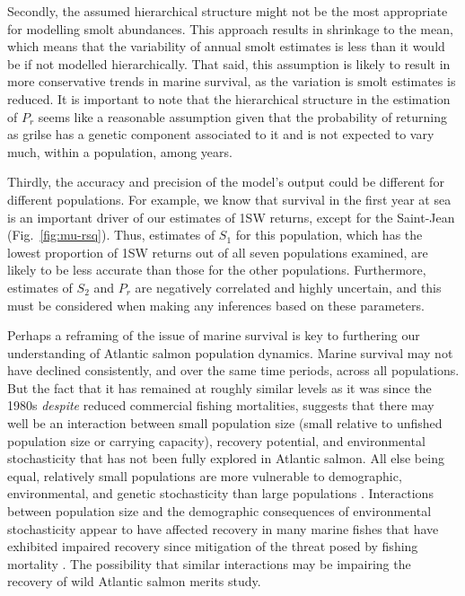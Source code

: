 \documentclass[12pt]{article}
\newcommand{\So}{$S_{1}$\xspace}
\newcommand{\St}{$S_{2}$\xspace}
\newcommand{\Pg}{$P_r$\xspace}
\begin{document}
Secondly, the assumed hierarchical structure might not be the most appropriate
for modelling smolt abundances. This approach results in shrinkage to the
mean, which means that the variability of annual smolt estimates is less than
it would be if not modelled hierarchically. 
That said, this assumption is likely to result in more conservative trends in marine survival, as the
variation is smolt estimates is reduced.
It is important to note that the hierarchical structure in the estimation of
\Pg seems like a reasonable assumption given that the probability of returning
as grilse has a genetic component associated to it \citep{Aykanat2019} and is
not expected to vary much, within a population, among years.

Thirdly, the accuracy and precision of the model's output could be different
for different populations. For example, we know that survival in the first
year at sea is an important driver of our estimates of 1SW returns, except for
the Saint-Jean (Fig.~\ref{fig:mu-rsq}). Thus, estimates of \So for this
population, which has the lowest proportion of 1SW returns out of all seven
populations examined, are likely to be less accurate than those for the other
populations.
Furthermore, estimates of \St and \Pg are negatively correlated and highly uncertain,
and this must be considered when making any inferences based on these parameters.

Perhaps a reframing of the issue of marine survival is key to furthering our
understanding of Atlantic salmon population dynamics. Marine survival may not
have declined consistently, and over the same time periods, across all
populations. 
But the fact that it has remained at roughly similar levels as it was
since the 1980s \emph{despite} reduced commercial fishing mortalities, suggests
that there may well be an interaction between small population size (small
relative to unfished population size or carrying capacity), recovery
potential, and environmental stochasticity that has not been fully explored in
Atlantic salmon. 
All else being equal, relatively small populations are more vulnerable to
demographic, environmental, and genetic stochasticity than large populations
\citep{Lande1993, Hutchings2015}. Interactions between population size and the
demographic consequences of environmental stochasticity appear to have
affected recovery in many marine fishes that have exhibited impaired recovery
since mitigation of the threat posed by fishing mortality
\citep{Hutchings2017, Hutchings2020}. The possibility that similar
interactions may be impairing the recovery of wild Atlantic salmon merits
study.
\end{document}
